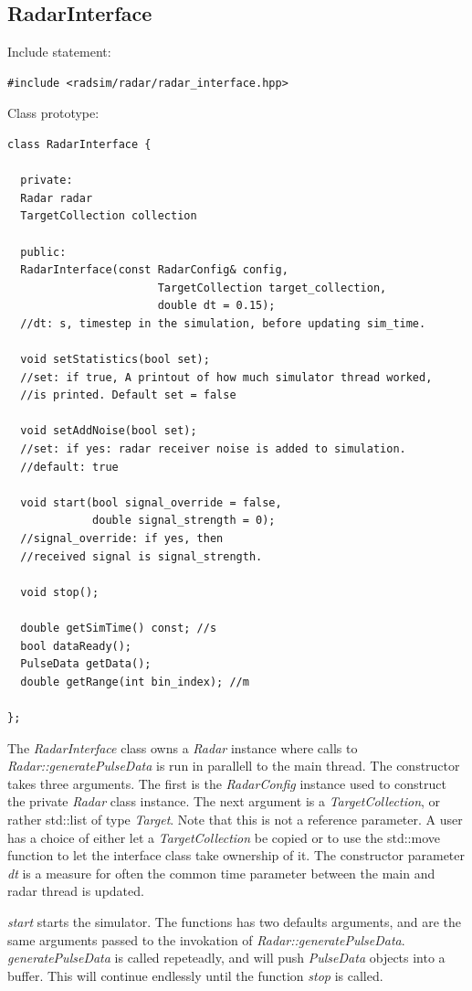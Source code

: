 \documentclass[letterpaper]{book}
\begin{document}
\subsection{RadarInterface}
\label{chap:RadarInterace}
Include statement:
\begin{lstlisting}
#include <radsim/radar/radar_interface.hpp>
\end{lstlisting}
Class prototype:
\begin{lstlisting}
class RadarInterface {

  private:
  Radar radar
  TargetCollection collection

  public:
  RadarInterface(const RadarConfig& config, 
                       TargetCollection target_collection, 
                       double dt = 0.15);
  //dt: s, timestep in the simulation, before updating sim_time. 

  void setStatistics(bool set);
  //set: if true, A printout of how much simulator thread worked, 
  //is printed. Default set = false

  void setAddNoise(bool set);
  //set: if yes: radar receiver noise is added to simulation.
  //default: true

  void start(bool signal_override = false, 
             double signal_strength = 0);
  //signal_override: if yes, then 
  //received signal is signal_strength.

  void stop();
    
  double getSimTime() const; //s
  bool dataReady();
  PulseData getData();
  double getRange(int bin_index); //m

};
\end{lstlisting}
The \textit{RadarInterface} class owns a \textit{Radar} instance where calls to \textit{Radar::generatePulseData} is run in parallell to the main thread. The constructor takes three arguments. The first is the \textit{RadarConfig} instance used to construct the private \textit{Radar} class instance. The next argument is a \textit{TargetCollection}, or rather std::list of type \textit{Target}. Note that this is not a reference parameter. A user has a choice of either let a \textit{TargetCollection} be copied or to use the std::move function to let the interface class take ownership of it. The constructor parameter \textit{dt} is a measure for often the common time parameter between the main and radar thread is updated. 

\textit{start} starts the simulator. The functions has two defaults arguments, and are the same arguments passed to the invokation of \textit{Radar::generatePulseData}. \textit{generatePulseData} is called repeteadly, and will push \textit{PulseData} objects into a buffer. This will continue endlessly until the function \textit{stop} is called. 
\end{document}
